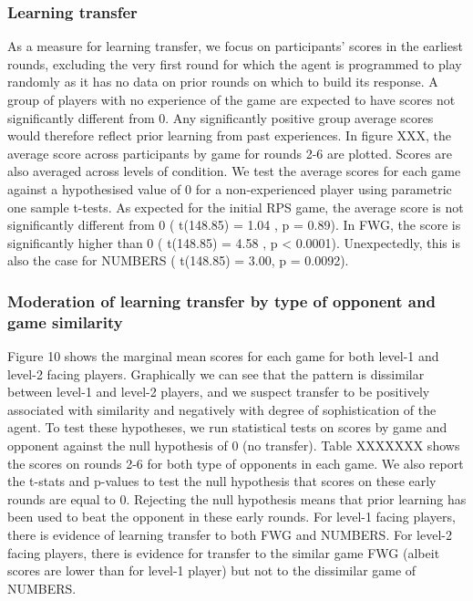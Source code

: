 \documentclass[,man,floatsintext]{apa6}
\begin{document}
\hypertarget{learning-transfer}{%
\subsubsection{Learning transfer}\label{learning-transfer}}

As a measure for learning transfer, we focus on participants' scores in the earliest rounds, excluding the very first round for which the agent is programmed to play randomly as it has no data on prior rounds on which to build its response. A group of players with no experience of the game are expected to have scores not significantly different from 0. Any significantly positive group average scores would therefore reflect prior learning from past experiences. In figure XXX, the average score across participants by game for rounds 2-6 are plotted. Scores are also averaged across levels of condition. We test the average scores for each game against a hypothesised value of 0 for a non-experienced player using parametric one sample t-tests. As expected for the initial RPS game, the average score is not significantly different from 0 ( t(148.85) = 1.04 , p = 0.89). In FWG, the score is significantly higher than 0 ( t(148.85) = 4.58 , p \textless{} 0.0001). Unexpectedly, this is also the case for NUMBERS ( t(148.85) = 3.00, p = 0.0092).

\hypertarget{moderation-of-learning-transfer-by-type-of-opponent-and-game-similarity}{%
\subsubsection{Moderation of learning transfer by type of opponent and game similarity}\label{moderation-of-learning-transfer-by-type-of-opponent-and-game-similarity}}

Figure 10 shows the marginal mean scores for each game for both level-1 and level-2 facing players. Graphically we can see that the pattern is dissimilar between level-1 and level-2 players, and we suspect transfer to be positively associated with similarity and negatively with degree of sophistication of the agent. To test these hypotheses, we run statistical tests on scores by game and opponent against the null hypothesis of 0 (no transfer). Table XXXXXXX shows the scores on rounds 2-6 for both type of opponents in each game. We also report the t-stats and p-values to test the null hypothesis that scores on these early rounds are equal to 0. Rejecting the null hypothesis means that prior learning has been used to beat the opponent in these early rounds. For level-1 facing players, there is evidence of learning transfer to both FWG and NUMBERS. For level-2 facing players, there is evidence for transfer to the similar game FWG (albeit scores are lower than for level-1 player) but not to the dissimilar game of NUMBERS.
\end{document}
